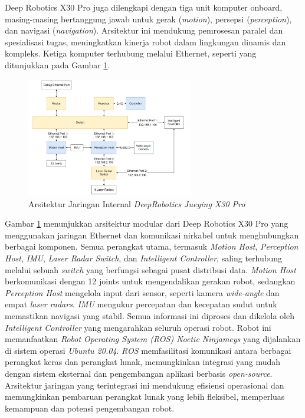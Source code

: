 Deep Robotics X30 Pro juga dilengkapi dengan tiga unit komputer onboard, masing-masing bertanggung jawab untuk gerak (\emph{motion}), persepsi (\emph{perception}), dan navigasi (\emph{navigation}). Arsitektur ini mendukung pemrosesan paralel dan spesialisasi tugas, meningkatkan kinerja robot dalam lingkungan dinamis dan kompleks. Ketiga komputer terhubung melalui Ethernet, seperti yang ditunjukkan pada Gambar \ref{fig:network_architecture_x30pro}.


\begin{figure}[H]
  \centering
  \includegraphics[width=0.65\textwidth]{gambar/bab2/network-x30.png}
  \caption{Arsitektur Jaringan Internal \emph{DeepRobotics Jueying X30 Pro} \cite{deeprobotics_jueyingx30}}
  \label{fig:network_architecture_x30pro}
\end{figure}

Gambar \ref{fig:network_architecture_x30pro} menunjukkan arsitektur modular dari Deep Robotics X30 Pro yang menggunakan jaringan Ethernet dan komunikasi nirkabel untuk menghubungkan berbagai komponen. Semua perangkat utama, termasuk \emph{Motion Host}, \emph{Perception Host}, \emph{IMU}, \emph{Laser Radar Switch}, dan \emph{Intelligent Controller}, saling terhubung melalui sebuah \emph{switch} yang berfungsi sebagai pusat distribusi data. \emph{Motion Host} berkomunikasi dengan 12 joints untuk mengendalikan gerakan robot, sedangkan \emph{Perception Host} mengelola input dari sensor, seperti kamera \emph{wide-angle} dan empat \emph{laser radars}. \emph{IMU} mengukur percepatan dan kecepatan sudut untuk memastikan navigasi yang stabil. Semua informasi ini diproses dan dikelola oleh \emph{Intelligent Controller} yang mengarahkan seluruh operasi robot. Robot ini memanfaatkan \emph{Robot Operating System (ROS) Noetic Ninjameys} yang dijalankan di sistem operasi \emph{Ubuntu 20.04}. \emph{ROS} memfasilitasi komunikasi antara berbagai perangkat keras dan perangkat lunak, memungkinkan integrasi yang mudah dengan sistem eksternal dan pengembangan aplikasi berbasis \emph{open-source}. Arsitektur jaringan yang terintegrasi ini mendukung efisiensi operasional dan memungkinkan pembaruan perangkat lunak yang lebih fleksibel, memperluas kemampuan dan potensi pengembangan robot.


